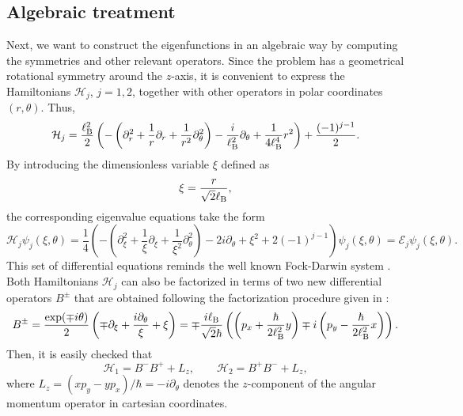 \documentclass[aps,showpacs,showkeys]{revtex4}
\begin{document}
\subsection{Algebraic treatment}\label{sec2.1}	
Next, we want to construct the eigenfunctions in an algebraic way by computing the symmetries and other relevant operators. Since the problem has a geometrical rotational symmetry around the $z$-axis, it is convenient to express the Hamiltonians $\mathcal{H}_j$, $j=1,2$, together with other operators in polar coordinates $(r,\theta)$. Thus, 
\begin{equation}\label{10}
\mathcal{H}_j= \frac{\ell_{\rm B}^{2}}{2} \left(-\left(\partial_r^2+\frac{1}{r}\partial_r+\frac{1}{r^2}\partial_\theta^2\right)-\frac{i}{\ell_{\rm B}^{2}}\partial_\theta+\frac{1}{4\ell_{\rm B}^{4}}r^2\right)+\frac{(-1)^{j-1}}{2}.
\end{equation}
By introducing the dimensionless variable $\xi$ defined as
\begin{equation}\label{11}
\xi=\frac{r}{\sqrt{2}\ell_{\rm B}},
\end{equation}
the corresponding eigenvalue equations take the form
\begin{equation}\label{12}
	\mathcal{H}_j\psi_j(\xi,\theta)=\frac{1}{4}\left(-\left(\partial_\xi^2+\frac{1}{\xi}\partial_\xi+\frac{1}{\xi^2}\partial_\theta^2\right)-2i\partial_\theta+\xi^2+2(-1)^{j-1}\right)\psi_j(\xi,\theta)=\mathcal{E}_j\psi_j(\xi,\theta).
\end{equation}
This set of differential equations reminds the well known Fock-Darwin system \cite{f28,d31,dknn17}. Both Hamiltonians $\mathcal{H}_j$ can also be factorized in terms of two new differential operators $B^\pm$ that are obtained following the factorization procedure given in \cite{df96,kka12}:
\begin{equation}\label{15}
B^\pm=\frac{\exp(\mp i\theta)}{2}\left(\mp\partial_\xi+\frac{i\partial_\theta}{\xi}+\xi\right)=\mp\frac{i\ell_{\rm B}}{\sqrt{2}\hbar} \left(\left(p_x+\frac{\hbar}{2\ell_{\rm B}^2} y\right)\mp i\left(p_y-\frac{\hbar}{2\ell_{\rm B}^2} x\right)\right).
\end{equation}
Then, it is easily checked that
\begin{equation}\label{17}
\mathcal{H}_1=B^-B^++L_z, \qquad \mathcal{H}_2=B^+B^-+L_z,
\end{equation}
where $L_z=\left(xp_y-yp_x\right)/\hbar=-i\partial_{\theta}$
denotes the $z$-component of the angular momentum operator in cartesian coordinates.
\end{document}
